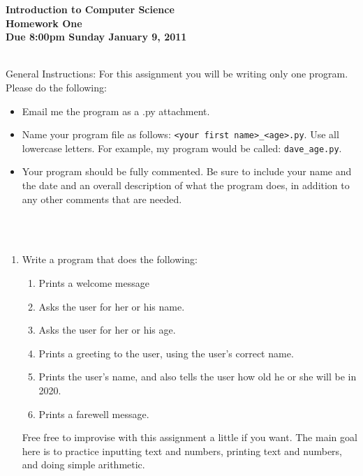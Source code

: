 \documentclass[12pt]{article}
\begin{document}
\pagestyle{empty}
 
\begin{center}
{\large {\bf Introduction to Computer Science}}\\
\medskip
{\large {\bf Homework One}}\\
\medskip
{ {\bf Due 8:00pm  Sunday January 9, 2011}}\\ 
\end{center}

\hspace{2mm}\\

\noindent General Instructions:  For this assignment you will be
writing only one program.  Please do the following:

\begin{itemize}
\setlength{\itemsep}{-1mm}
  \item Email me the program as a .py attachment.
  \item Name your program file as follows:  {\tt <your first
    name>\_<age>.py}.  Use all lowercase letters.  For example, my
    program would be called: {\tt dave\_age.py}.
  \item Your program should be fully commented.  Be sure to include
    your name and the date and an overall description of what the
    program does, in addition to any other comments that are needed. 
\end{itemize}


\hspace{2mm}\\
\hspace{2mm}\\

\begin{enumerate}

\item Write a program that does the following:
\begin{enumerate}
\setlength{\itemsep}{-1mm}
  \item Prints a welcome message
  \item Asks the user for her or his name.
  \item Asks the user for her or his age.
  \item Prints a greeting to the user, using the user's correct name. 
  \item Prints the user's name, and also tells the user how old he or
    she will be in 2020.
  \item Prints a farewell message.

\end{enumerate}

Free free to improvise with this assignment a little if you want.  The
main goal here is to practice inputting text and numbers, printing
text and numbers, and doing simple arithmetic. 

\end{enumerate}
\end{document}
